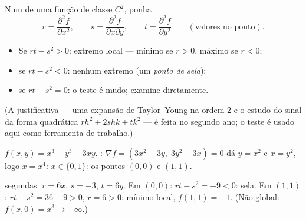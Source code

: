 \begin{method}\label{met:b1:multivar:monge}
Num  de uma função de classe $C^2$, ponha
\[
r = \frac{\partial^2 f}{\partial x^2},
\qquad
s = \frac{\partial^2 f}{\partial x \partial y},
\qquad
t = \frac{\partial^2 f}{\partial y^2}
\qquad (\text{valores no ponto}).
\]
\begin{itemize}
  \item Se $rt - s^2 > 0$: extremo local --- mínimo se $r > 0$, máximo se
        $r < 0$;
  \item se $rt - s^2 < 0$: nenhum extremo (um \emph{ponto de
        sela});
  \item se $rt - s^2 = 0$: o teste é mudo; examine diretamente.
\end{itemize}
(A justificativa --- uma expansão de Taylor--Young na ordem $2$ e o
estudo do sinal da forma quadrática $r h^2 + 2shk + tk^2$ --- é feita no segundo ano;
o teste é usado aqui como ferramenta de trabalho.)
\end{method}

\begin{example}\label{ex:b1:multivar:extrema}
$f(x,y) = x^3 + y^3 - 3xy$. : $\nabla f = (3x^2 -
3y,\; 3y^2 - 3x) = 0$ dá $y = x^2$ e $x = y^2$, logo
$x = x^4$: $x \in \{0, 1\}$: os pontos $(0,0)$ e $(1,1)$.

 segundas: $r = 6x$, $s = -3$, $t = 6y$. Em $(0,0)$: $rt -
s^2 = -9 < 0$:
sela. Em $(1,1)$: $rt - s^2 = 36 - 9 > 0$, $r = 6
> 0$: mínimo local, $f(1,1) = -1$. (Não global:
$f(x, 0) = x^3 \to
-\infty$.)
\end{example}


